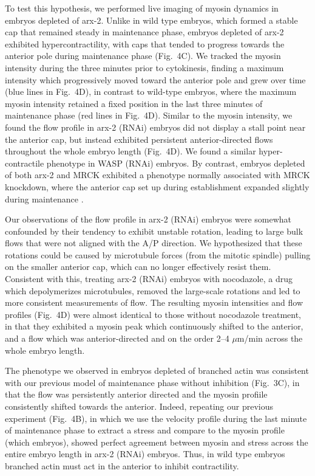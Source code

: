 \documentclass[11pt]{article}
\newcommand{\red}[1]{\color{red}#1\normalcolor}
\newcommand{\6}[1]{#1_{\text{6}}}
\newcommand{\3}[1]{#1_{\text{3}}}
\begin{document}
To test this hypothesis, we performed live imaging of myosin dynamics in embryos depleted of arx-2. Unlike in wild type embryos, which formed a stable cap that remained steady in maintenance phase, embryos depleted of arx-2 exhibited hypercontractility, with caps that tended to progress towards the anterior pole during maintenance phase (Fig.\ 4C). We tracked the myosin intensity during the three minutes prior to cytokinesis, finding a maximum intensity which progressively moved toward the anterior pole and grew over time (blue lines in Fig.\ 4D), in contrast to wild-type embryos, where the maximum myosin intensity retained a fixed position in the last three minutes of maintenance phase (red lines in Fig.\ 4D). Similar to the myosin intensity, we found the flow profile in arx-2 (RNAi) embryos did not display a stall point near the anterior cap, but instead exhibited persistent anterior-directed flows throughout the whole embryo length (Fig.\ 4D). We found a similar hyper-contractile phenotype in WASP (RNAi) embryos. By contrast, embryos depleted of both arx-2 and MRCK exhibited a phenotype normally associated with MRCK knockdown, where the anterior cap set up during establishment expanded slightly during maintenance \citep{sailer2015dynamic}.

Our observations of the flow profile in arx-2 (RNAi) embryos were somewhat confounded by their tendency to exhibit unstable rotation, leading to large bulk flows that were not aligned with the A/P direction. We hypothesized that these rotations could be caused by microtubule forces (from the mitotic spindle) pulling on the smaller anterior cap, which can no longer effectively resist them. Consistent with this, treating arx-2 (RNAi) embryos with nocodazole, a drug which depolymerizes microtubules, removed the large-scale rotations and led to more consistent measurements of flow. The resulting myosin intensities and flow profiles (Fig.\ 4D) were almost identical to those without nocodazole treatment, in that they exhibited a myosin peak which continuously shifted to the anterior, and a flow which was anterior-directed and on the order 2--4 $\mu$m/min across the whole embryo length.

The phenotype we observed in embryos depleted of branched actin was consistent with our previous model of maintenance phase without inhibition (Fig.\ 3C), in that the flow was persistently anterior directed and the myosin profiile consistently shifted towards the anterior. Indeed, repeating our previous experiment (Fig.\ 4B), in which we use the velocity profile during the last minute of maintenance phase to extract a stress and compare to the myosin profile \red{(which embryos)}, showed perfect agreement between myosin and stress across the entire embryo length in arx-2 (RNAi) embryos. Thus, in wild type embryos branched actin must act in the anterior to inhibit contractility.
\end{document}
